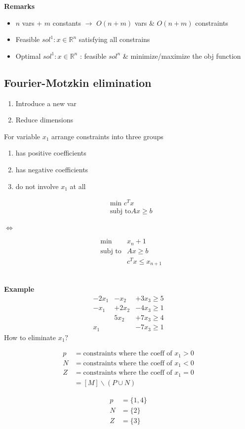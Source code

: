 \documentclass[12pt]{article}
\begin{document}
\textbf{Remarks}
\begin{itemize}
	\item $n$ vars + $m$ constants $\to$ $O(n+m)$ vars \& $O(n+m)$ constraints
	\item Feasible $sol^1: x\in \mathbb{R}^n$ satisfying all constrains
	\item Optimal $sol^1: x\in \mathbb{R}^n$ : feasible $sol^n$ \& minimize/maximize the obj function
\end{itemize}

\subsection{Fourier-Motzkin elimination}
\begin{enumerate}
	\item Introduce a new var
	\item Reduce dimensions
\end{enumerate}
For variable $x_1$ arrange constraints into three groups
\begin{enumerate}
	\item has positive coefficients
	\item has negative coefficients
	\item do not involve $x_1$ at all
\end{enumerate}
\begin{minipage}{8em}
	\begin{align*}
	&\text{min } c^Tx\\
	&\text{subj to} Ax \geq b\\
	\end{align*}
\end{minipage}
$\Longleftrightarrow$
\begin{minipage}{8em}
	\begin{align*}
	&\text{min } &x_n+1\\
	&\text{subj to} &Ax \geq b\\
	&&c^Tx \leq x_{n+1}
	\end{align*}
\end{minipage}\\
\textbf{Example}
\begin{eqnarray}
	-2x_1 &-x_2&+3x_3 \geq 5\\
	-x_1 &+2x_2&-4x_3 \geq 1\\
	&5x_2&+7x_3 \geq 4\\
	x_1 &&-7x_3 \geq 1
\end{eqnarray}
How to eliminate $x_1?$
\begin{multicols}{2}
\begin{align*}
p &= \text{constraints where the coeff of }x_1 > 0\\
N &= \text{constraints where the coeff of }x_1 < 0\\
Z &= \text{constraints where the coeff of }x_1 = 0\\
&=[M]\backslash(P\cup N)
\end{align*}
\columnbreak

\begin{align*}
p &= \{1,4\}\\
N &= \{2\}\\
Z &= \{3\}
\end{align*}
\end{multicols}
\end{document}
